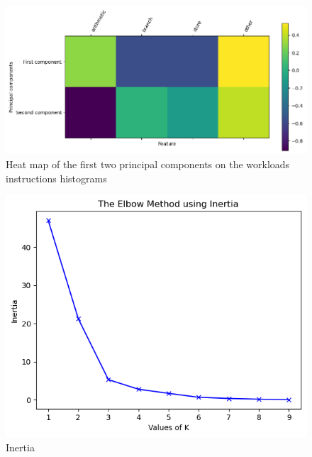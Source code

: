 \documentclass[]{PhDEngScITESO-R}
\begin{document}
\begin{figure}[h]
    \centering
    \includegraphics[width=\textwidth] {Reporte IDI-2 ITESO/img/heat_spec.png}
    \caption{ Heat map of the first two principal components on the workloads instructions histograms}
    \label{fig:heat_map}
\end{figure}

\begin{figure}[h]
    \centering
    \includegraphics[width=\textwidth] {Reporte IDI-2 ITESO/img/inertia_spec.png}
    \caption{Inertia }
    \label{fig:inertia}
\end{figure}
\end{document}
